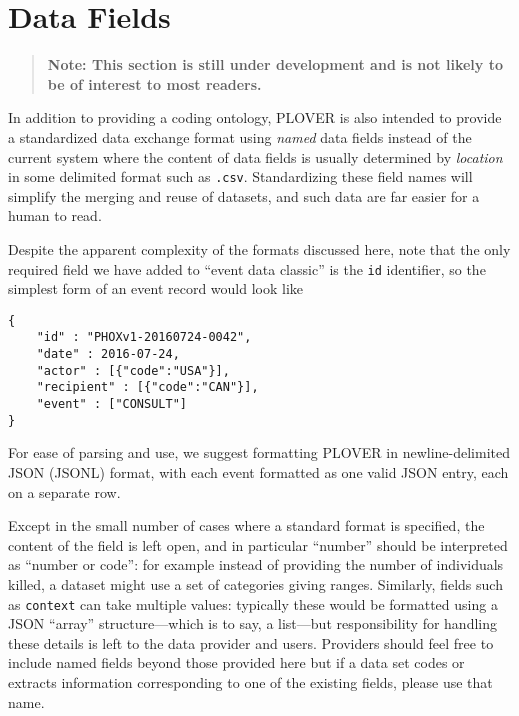 \documentclass[11pt]{report}
\newcommand{\ti}[1]{\textit{#1}}
\newcommand{\txt}[1]{\texttt{#1}}
\begin{document}
\chapter{Data Fields}

\begin{quote}
\textbf{Note: This section is still under development and is not likely to be of interest to most readers.}

\end{quote}
\bigskip

In addition to providing a coding ontology, PLOVER is also intended to provide a standardized data exchange format using \ti{named} data fields instead of the current system where the content of data fields is usually determined by \ti{location} in some delimited format such as \txt{.csv}. Standardizing these field names will simplify the merging and reuse of datasets, and such data are far easier for a human to read.

Despite the apparent complexity of the formats discussed here, note that the only required field we have added to ``event data classic'' is the \texttt{id} identifier, so the simplest form of an event record would look like
\begin{verbatim}
{
	"id" : "PHOXv1-20160724-0042",
	"date" : 2016-07-24,
	"actor" : [{"code":"USA"}],
	"recipient" : [{"code":"CAN"}],
	"event" : ["CONSULT"]
}
\end{verbatim}

\noindent For ease of parsing and use, we suggest formatting PLOVER in newline-delimited JSON (JSONL) format, with each event formatted as one valid JSON entry, each on a separate row.

Except in the small number of cases where a standard format is specified, the content of the field is left open, and in particular ``number'' should be interpreted as ``number or code'': for example instead of providing the number of individuals killed, a dataset might use a set of categories giving ranges. Similarly, fields such as \texttt{context} can take multiple values: typically these would be formatted using a JSON ``array'' structure---which is to say, a list---but responsibility for handling these details is left to the data provider and users.  Providers should feel free to include named fields beyond those provided here but if a data set codes or extracts information  corresponding to one of the existing fields, please use that name.

\end{document}

